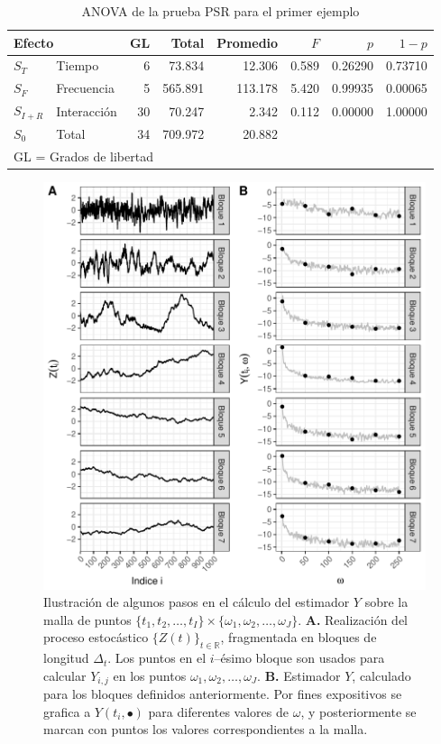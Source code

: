 \documentclass[12pt,letterpaper]{book}
\newcommand{\R}{\mathbb{R}}
\begin{document}
\begin{table}
\label{tab:ejemplo_gl}
\centering
\caption{ANOVA de la prueba PSR para el primer ejemplo}
\begin{tabular}{llrrrrrr}
\toprule
\multicolumn{2}{l}{Efecto}
                        & GL & Total   & Promedio & $F$   & $p$     & $1-p$   \\
\midrule
$S_T$     & Tiempo      & 6  & 73.834  & 12.306   & 0.589 & 0.26290 & 0.73710 \\
$S_F$     & Frecuencia  & 5  & 565.891 & 113.178  & 5.420 & 0.99935 & 0.00065 \\
$S_{I+R}$ & Interacción & 30 & 70.247  & 2.342    & 0.112 & 0.00000 & 1.00000 \\
$S_0$     & Total       & 34 & 709.972 & 20.882   &       &         &         \\
\bottomrule
\multicolumn{5}{l}{GL = Grados de libertad}
\end{tabular}
\end{table}

\begin{figure}
\centering
\includegraphics[width=\linewidth]{./scripts_graf_res/proceso_Z_fragmentado_doble.pdf}
\caption[Algunos pasos en el cálculo del estimador $Y$]{Ilustración de algunos pasos en el cálculo del estimador $Y$ sobre la malla de puntos $\{ t_1, t_2, \dots, t_I\} \times \{\omega_1, \omega_2, \dots, \omega_J\}$.
\textbf{A.}
Realización del proceso estocástico $\{Z(t)\}_{t\in\R}$, fragmentada en bloques de longitud $\Delta_t$. 
%
Los puntos en el $i$--ésimo bloque son usados para calcular $Y_{i,j}$ en los puntos $\omega_1, \omega_2, \dots, \omega_J$.
\textbf{B.}
Estimador $Y$, calculado para los bloques definidos anteriormente.
%
Por fines expositivos se grafica a $Y(t_i,\bullet)$ para diferentes valores de $\omega$, y posteriormente se marcan con puntos los valores correspondientes a la malla.}
\label{fig:proceso_psr}
\end{figure}
\end{document}
